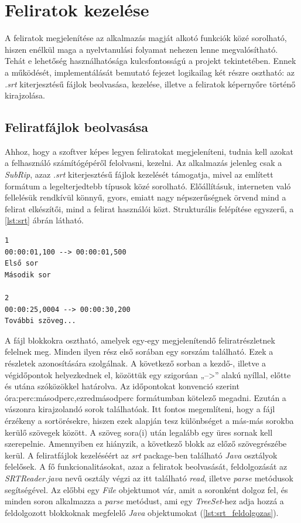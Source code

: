 \section{Feliratok kezelése}
A feliratok megjelenítése az alkalmazás magját alkotó funkciók közé sorolható, hiszen enélkül maga a nyelvtanulási folyamat nehezen lenne megvalósítható. Tehát e lehetőség használhatósága kulcsfontosságú a projekt tekintetében. Ennek a működését, implementálását bemutató fejezet logikailag két részre osztható: az \textit{.srt} kiterjesztésű fájlok beolvasása, kezelése, illetve a feliratok képernyőre történő kirajzolása.

\subsection{Feliratfájlok beolvasása}
Ahhoz, hogy a szoftver képes legyen feliratokat megjeleníteni, tudnia kell azokat a felhasználó számítógépéről felolvasni, kezelni. Az alkalmazás jelenleg csak a \textit{SubRip}, azaz \textit{.srt} kiterjesztésű fájlok kezelését támogatja, mivel az említett formátum a legelterjedtebb típusok közé sorolható. Előállításuk, interneten való fellelésük rendkívül könnyű, gyors, emiatt nagy népszerűségnek örvend mind a felirat elkészítői, mind a felirat használói közt. Strukturális felépítése egyszerű, a \ref{lst:srt} ábrán látható.

\begin{verbatim}
1
00:00:01,100 --> 00:00:01,500
Első sor
Második sor
 
2 
00:00:25,0004 --> 00:00:30,200 
További szöveg...
\end{verbatim}

A fájl blokkokra osztható, amelyek egy-egy megjelenítendő feliratrészletnek felelnek meg. Minden ilyen rész első sorában egy sorszám található. Ezek a részletek azonosítására szolgálnak. A következő sorban a kezdő-, illetve a végidőpontok helyezkednek el, közöttük egy szigorúan „-->” alakú nyíllal, előtte és utána szóközökkel határolva. Az időpontokat konvenció szerint óra:perc:másodperc,ezredmásodperc formátumban kötelező megadni. Ezután a vászonra kirajzolandó sorok találhatóak. Itt fontos megemlíteni, hogy a fájl érzékeny a sortörésekre, hiszen ezek alapján tesz különbséget a más-más sorokba kerülő szövegek között. A szöveg sora(i) után legalább egy üres sornak kell szerepelnie. Amennyiben ez hiányzik, a következő blokk az előző szövegrészébe kerül.
A feliratfájlok kezeléséért az \textit{srt} package-ben található \textit{Java} osztályok felelősek. A fő funkcionalitásokat, azaz a feliratok beolvasását, feldolgozását az \textit{SRTReader.java} nevű osztály végzi az itt található \textit{read}, illetve \textit{parse} metódusok segítségével. Az előbbi egy \textit{File} objektumot vár, amit a soronként dolgoz fel, és minden soron alkalmazza a \textit{parse} metódust, ami egy \textit{TreeSet}-hez adja hozzá a feldolgozott blokkoknak megfelelő \textit{Java} objektumokat (\ref{lst:srt_feldolgozas}).


